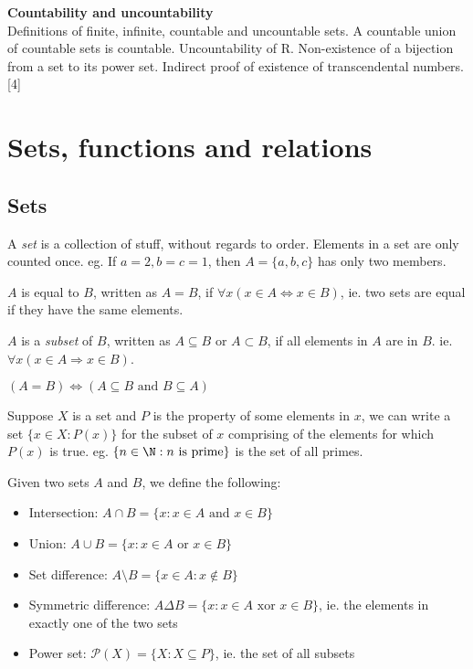 \documentclass[a4paper]{article}
\begin{document}
{  \vspace{10pt}
  \noindent\textbf{Countability and uncountability}\\
  Definitions of finite, infinite, countable and uncountable sets. A countable union of countable sets is countable. Uncountability of R. Non-existence of a bijection from a set to its power set. Indirect proof of existence of transcendental numbers.\hspace*{\fill}[4]}

  \tableofcontents
  \newpage
  \section{Sets, functions and relations}
  \subsection{Sets}
  \begin{defi}[Set]
    A \emph{set} is a collection of stuff, without regards to order. Elements in a set are only counted once. eg. If $a = 2, b = c = 1$, then $A = \{a, b, c\}$ has only two members.
  \end{defi}

  \begin{defi}
    $A$ is equal to $B$, written as $A = B$, if $\forall x(x\in A \Leftrightarrow x\in B)$, ie. two sets are equal if they have the same elements.
  \end{defi}

  \begin{defi}[Subsets]
    $A$ is a \emph{subset} of $B$, written as $A\subseteq B$ or $A\subset B$, if all elements in $A$ are in $B$. ie. $\forall x(x\in A\Rightarrow x\in B)$.
  \end{defi}

  \begin{thm}
    $(A=B)\Leftrightarrow (A\subseteq B \text{ and }B\subseteq A)$
  \end{thm}

  Suppose $X$ is a set and $P$ is the property of some elements in $x$, we can write a set $\{x\in X:P(x)\}$ for the subset of $x$ comprising of the elements for which $P(x)$ is true. eg. $\{n\in \N : n \text{ is prime}\}$ is the set of all primes.

  \begin{defi}
    Given two sets $A$ and $B$, we define the following:
    \begin{itemize}
      \item Intersection: $A\cap B = \{x:x\in A \text{ and } x\in B\}$
      \item Union: $A\cup B = \{x:x\in A\text{ or }x\in B\}$
      \item Set difference: $A\setminus B = \{x\in A: x\not\in B\}$
      \item Symmetric difference: $A\Delta B = \{x: x\in A\text{ xor } x\in B\}$, ie. the elements in exactly one of the two sets
      \item Power set: $\mathcal{P}(X) = \{X: X\subseteq P\}$, ie. the set of all subsets
    \end{itemize}
  \end{defi}
\end{document}
